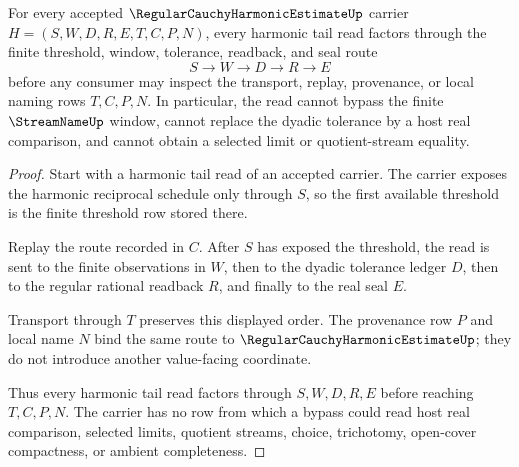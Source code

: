 \begin{theorem}
\label{thm:regular-cauchy-harmonic-estimate-tail-window}
For every accepted $\RegularCauchyHarmonicEstimateUp$ carrier
$H=(S,W,D,R,E,T,C,P,N)$, every harmonic tail read factors through the finite threshold, window, tolerance, readback, and seal route
$$
S \longrightarrow W \longrightarrow D \longrightarrow R \longrightarrow E
$$
before any consumer may inspect the transport, replay, provenance, or local naming rows $T,C,P,N$. In particular, the read cannot bypass the finite $\StreamNameUp$ window, cannot replace the dyadic tolerance by a host real comparison, and cannot obtain a selected limit or quotient-stream equality.
\end{theorem}
\begin{proof}
Start with a harmonic tail read of an accepted carrier. The carrier exposes the harmonic reciprocal schedule only through $S$, so the first available threshold is the finite threshold row stored there.

Replay the route recorded in $C$. After $S$ has exposed the threshold, the read is sent to the finite observations in $W$, then to the dyadic tolerance ledger $D$, then to the regular rational readback $R$, and finally to the real seal $E$.

Transport through $T$ preserves this displayed order. The provenance row $P$ and local name $N$ bind the same route to $\RegularCauchyHarmonicEstimateUp$; they do not introduce another value-facing coordinate.

Thus every harmonic tail read factors through $S,W,D,R,E$ before reaching $T,C,P,N$. The carrier has no row from which a bypass could read host real comparison, selected limits, quotient streams, choice, trichotomy, open-cover compactness, or ambient completeness.
\end{proof}


\begin{closurestatus}{\RegularCauchyHarmonicEstimateUp}
  \theoryclosure{\seedClosure}
  \formalstatus{\unformalizedV}
\end{closurestatus}
